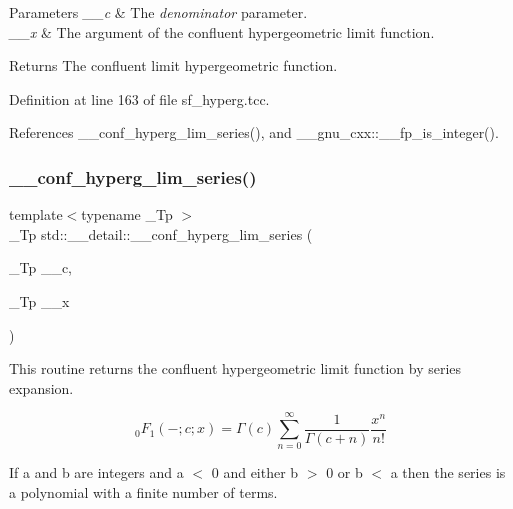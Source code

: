 \begin{DoxyParams}{Parameters}
{\em \+\_\+\+\_\+c} & The {\itshape denominator} parameter. \\
\hline
{\em \+\_\+\+\_\+x} & The argument of the confluent hypergeometric limit function. \\
\hline
\end{DoxyParams}
\begin{DoxyReturn}{Returns}
The confluent limit hypergeometric function. 
\end{DoxyReturn}


Definition at line 163 of file sf\+\_\+hyperg.\+tcc.



References \+\_\+\+\_\+conf\+\_\+hyperg\+\_\+lim\+\_\+series(), and \+\_\+\+\_\+gnu\+\_\+cxx\+::\+\_\+\+\_\+fp\+\_\+is\+\_\+integer().

\mbox{\label{namespacestd_1_1____detail_a44b73ec79e0a8cfd1f29a21cb39f2bdc}} 
\subsubsection{\texorpdfstring{\+\_\+\+\_\+conf\+\_\+hyperg\+\_\+lim\+\_\+series()}{\_\_conf\_hyperg\_lim\_series()}}
{\footnotesize\ttfamily template$<$typename \+\_\+\+Tp $>$ \\
\+\_\+\+Tp std\+::\+\_\+\+\_\+detail\+::\+\_\+\+\_\+conf\+\_\+hyperg\+\_\+lim\+\_\+series (\begin{DoxyParamCaption}\item[{\+\_\+\+Tp}]{\+\_\+\+\_\+c,  }\item[{\+\_\+\+Tp}]{\+\_\+\+\_\+x }\end{DoxyParamCaption})}



This routine returns the confluent hypergeometric limit function by series expansion. 

\[ {}_0F_1(-;c;x) = \Gamma(c) \sum_{n=0}^{\infty} \frac{1}{\Gamma(c+n)} \frac{x^n}{n!} \]

If a and b are integers and a $<$ 0 and either b $>$ 0 or b $<$ a then the series is a polynomial with a finite number of terms.


